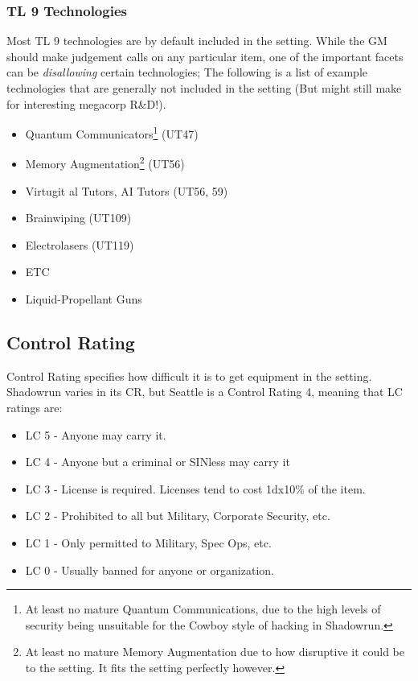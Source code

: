 \begin{multicols}{3}
	\subsubsection{TL 9 Technologies}
	
	Most TL 9 technologies are by default included in the setting. While the GM should make judgement calls on any particular item, one of the important facets can be \textit{disallowing} certain technologies; The following is a list of example technologies that are generally not included in the setting (But might still make for interesting megacorp R\&D!).
	
	\begin{itemize}
		\itemsep 0pt
		\item Quantum Communicators\footnote{At least no mature Quantum Communications, due to the high levels of security being unsuitable for the Cowboy style of hacking in Shadowrun.} (UT47)
		\item Memory Augmentation\footnote{At least no mature Memory Augmentation due to how disruptive it could be to the setting. It fits the setting perfectly however.} (UT56)
		\item Virtugit al Tutors, AI Tutors (UT56, 59)
		\item Brainwiping (UT109)
		\item Electrolasers (UT119)
		\item ETC
		\item Liquid-Propellant Guns
	\end{itemize}
	
	\subsection{Control Rating}
	
	Control Rating specifies how difficult it is to get equipment in the setting. Shadowrun varies in its CR, but Seattle is a Control Rating 4, meaning that LC ratings are:
	
	\begin{itemize}
		\itemsep 0pt
		\item LC 5 - Anyone may carry it.
		\item LC 4 - Anyone but a criminal or SINless may carry it
		\item LC 3 - License is required. Licenses tend to cost 1dx10\% of the item.
		\item LC 2 - Prohibited to all but Military, Corporate Security, etc.
		\item LC 1 - Only permitted to Military, Spec Ops, etc.
		\item LC 0 - Usually banned for anyone or organization.
	\end{itemize}
	

\end{multicols}
